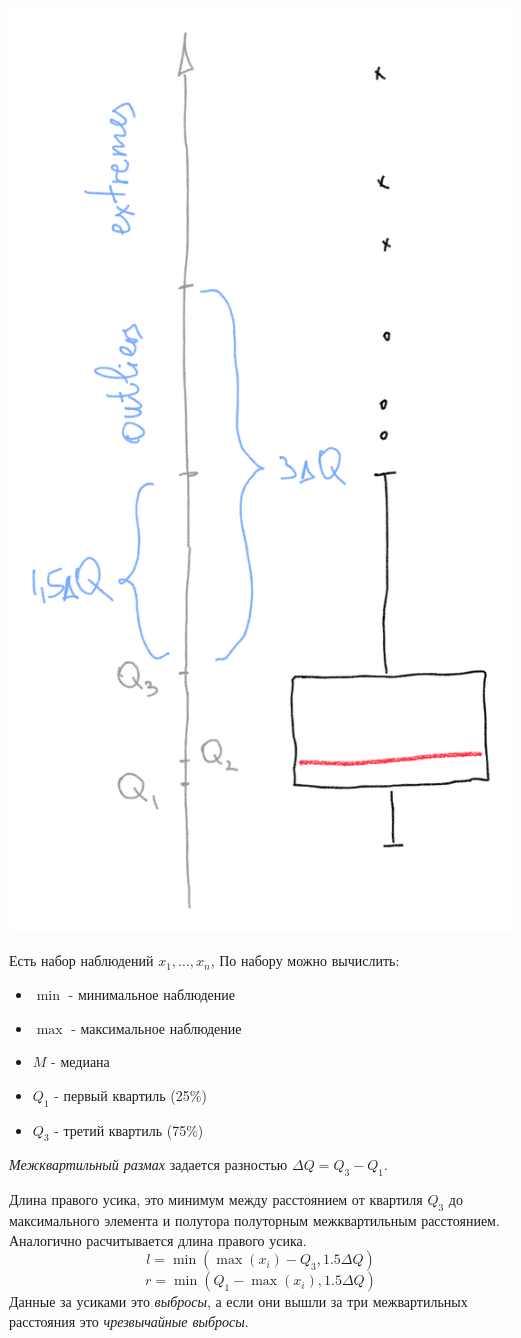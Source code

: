 \documentclass[a4paper, oneside]{book}
\begin{document}
\begin{marginfigure}
    \includegraphics[width=0.7\columnwidth]{pics/boxplot.pdf}
    \label{fig:boxplot}
\end{marginfigure}

Есть набор наблюдений $x_1, \dots, x_n$, По набору можно вычислить:
\begin{itemize}
    \item $\min$ - минимальное наблюдение
    \item $\max$ - максимальное наблюдение
    \item $M$ - медиана
    \item $Q_1$ - первый квартиль (25\%)
    \item $Q_3$ - третий квартиль (75\%)
\end{itemize}

\emph{Межквартильный размах} задается разностью $\Delta Q = Q_3 - Q_1$.

Длина правого усика, это минимум между расстоянием от квартиля $Q_3$ до
максимального элемента и полутора полуторным межквартильным расстоянием.
Аналогично расчитывается длина правого усика.
\[l = \min(\max(x_i) - Q_3, 1.5 \Delta Q)\]
\[r = \min(Q_1 - \max(x_i), 1.5 \Delta Q)\]
Данные за усиками это \emph{выбросы}, а если они вышли за три межвартильных
расстояния это \emph{чрезвычайные выбросы}.
\end{document}
